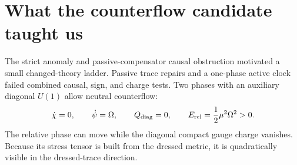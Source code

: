 \documentclass[11pt]{article}
\begin{document}
\section{What the counterflow candidate taught us}
\label{sec:counterflow}

The strict anomaly and passive-compensator causal obstruction motivated a
small changed-theory ladder.  Passive trace repairs and a one-phase active
clock failed combined causal, sign, and charge tests.  Two phases with an
auxiliary diagonal $U(1)$ allow neutral counterflow:
\begin{equation}
 \dot\chi=0,
 \qquad \dot\psi=\Omega,
 \qquad Q_{\rm diag}=0,
 \qquad E_{\rm rel}=\frac12\mu^2\Omega^2>0.
\end{equation}
The relative phase can move while the diagonal compact gauge charge
vanishes.  Because its stress tensor is built from the dressed metric, it is
quadratically visible in the dressed-trace direction.
\end{document}

